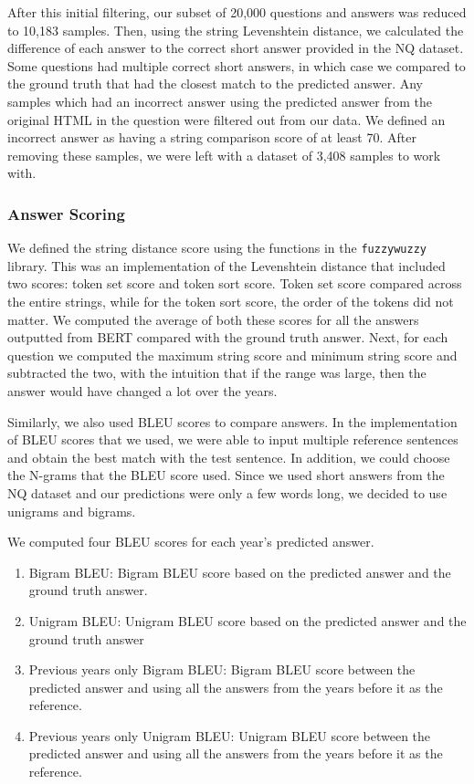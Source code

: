 \documentclass{article}
\begin{document}
After this initial filtering, our subset of 20,000 questions and answers was reduced to 10,183 samples. Then, using the string Levenshtein distance, we calculated the difference of each answer to the correct short answer provided in the NQ dataset. Some questions had multiple correct short answers, in which case we compared to the ground truth that had the closest match to the predicted answer. Any samples which had an incorrect answer using the predicted answer from the original HTML in the question were filtered out from our data. We defined an incorrect answer as having a string comparison score of at least 70. After removing these samples, we were left with a dataset of 3,408 samples to work with. 

\subsubsection{Answer Scoring}
We defined the string distance score using the functions in the {\tt fuzzywuzzy} library. This was an implementation of the Levenshtein distance that included two scores: token set score and token sort score. Token set score compared across the entire strings, while for the token sort score, the order of the tokens did not matter. We computed the average of both these scores for all the answers outputted from BERT compared with the ground truth answer. Next, for each question we computed the maximum string score and minimum string score and subtracted the two, with the intuition that if the range was large, then the answer would have changed a lot over the years. 

Similarly, we also used BLEU scores to compare answers. In the implementation of BLEU scores that we used, we were able to input multiple reference sentences and obtain the best match with the test sentence. In addition, we could choose the N-grams that the BLEU score used. Since we used short answers from the NQ dataset and our predictions were only a few words long, we decided to use unigrams and bigrams. 

We computed four BLEU scores for each year’s predicted answer. 
\begin{enumerate}
    \item Bigram BLEU: Bigram BLEU score based on the predicted answer and the ground truth answer. 
    \item Unigram BLEU: Unigram BLEU score based on the predicted answer and the ground truth answer
    \item Previous years only Bigram BLEU: Bigram BLEU score between the predicted answer and using all the answers from the years before it as the reference. 
    \item Previous years only Unigram BLEU: Unigram BLEU score between the predicted answer and using all the answers from the years before it as the reference. 
\end{enumerate}
\end{document}
